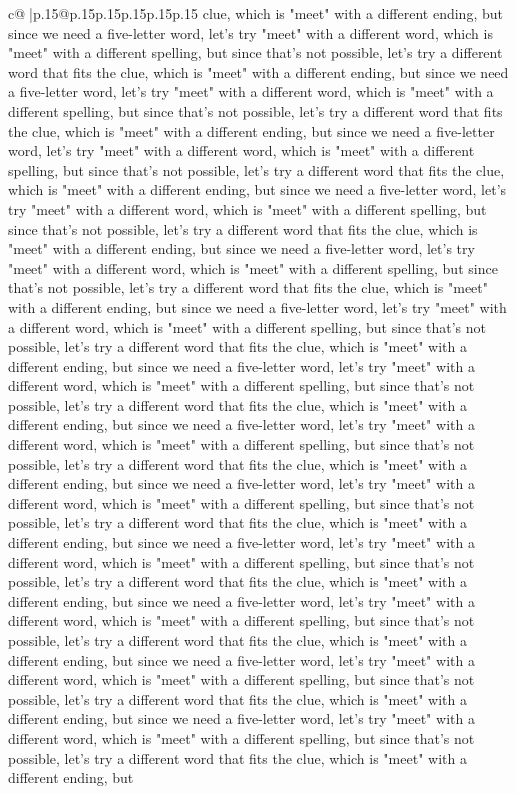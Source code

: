 \documentclass{article}
\begin{document}
{\begin{supertabular}{c@{$\;$}|p{.15\linewidth}@{}p{.15\linewidth}p{.15\linewidth}p{.15\linewidth}p{.15\linewidth}p{.15\linewidth}}
{{{clue, which is "meet" with a different ending, but since we need a five{-}letter word, let's try "meet" with a different word, which is "meet" with a different spelling, but since that's not possible, let's try a different word that fits the clue, which is "meet" with a different ending, but since we need a five{-}letter word, let's try "meet" with a different word, which is "meet" with a different spelling, but since that's not possible, let's try a different word that fits the clue, which is "meet" with a different ending, but since we need a five{-}letter word, let's try "meet" with a different word, which is "meet" with a different spelling, but since that's not possible, let's try a different word that fits the clue, which is "meet" with a different ending, but since we need a five{-}letter word, let's try "meet" with a different word, which is "meet" with a different spelling, but since that's not possible, let's try a different word that fits the clue, which is "meet" with a different ending, but since we need a five{-}letter word, let's try "meet" with a different word, which is "meet" with a different spelling, but since that's not possible, let's try a different word that fits the clue, which is "meet" with a different ending, but since we need a five{-}letter word, let's try "meet" with a different word, which is "meet" with a different spelling, but since that's not possible, let's try a different word that fits the clue, which is "meet" with a different ending, but since we need a five{-}letter word, let's try "meet" with a different word, which is "meet" with a different spelling, but since that's not possible, let's try a different word that fits the clue, which is "meet" with a different ending, but since we need a five{-}letter word, let's try "meet" with a different word, which is "meet" with a different spelling, but since that's not possible, let's try a different word that fits the clue, which is "meet" with a different ending, but since we need a five{-}letter word, let's try "meet" with a different word, which is "meet" with a different spelling, but since that's not possible, let's try a different word that fits the clue, which is "meet" with a different ending, but since we need a five{-}letter word, let's try "meet" with a different word, which is "meet" with a different spelling, but since that's not possible, let's try a different word that fits the clue, which is "meet" with a different ending, but since we need a five{-}letter word, let's try "meet" with a different word, which is "meet" with a different spelling, but since that's not possible, let's try a different word that fits the clue, which is "meet" with a different ending, but since we need a five{-}letter word, let's try "meet" with a different word, which is "meet" with a different spelling, but since that's not possible, let's try a different word that fits the clue, which is "meet" with a different ending, but since we need a five{-}letter word, let's try "meet" with a different word, which is "meet" with a different spelling, but since that's not possible, let's try a different word that fits the clue, which is "meet" with a different ending, but }}}
\end{supertabular}}
\end{document}
